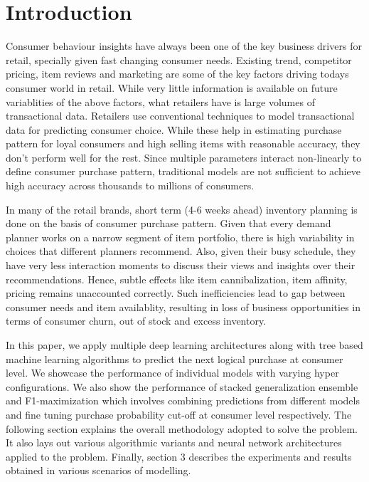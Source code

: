 \section{Introduction}
Consumer behaviour insights have always been one of the key business drivers for retail, specially given
fast changing consumer needs. Existing trend, competitor pricing, item reviews and marketing are some of the 
key factors driving todays consumer world in retail. While very little information is available
on future variablities of the above factors, what retailers have is large volumes of transactional data.
Retailers use conventional techniques to model transactional data for predicting consumer choice. 
While these help in estimating purchase pattern for loyal consumers and high selling items with reasonable accuracy, they 
don't perform well for the rest. Since multiple parameters interact non-linearly to define consumer purchase pattern,
traditional models are not sufficient to achieve high accuracy across thousands to millions of consumers.

In many of the retail brands, short term (4-6 weeks ahead) inventory planning is done on the basis of consumer 
purchase pattern. Given that every demand planner works on a narrow segment of item portfolio, there is high 
variability in choices that different planners recommend. Also, given their busy schedule, they have very less interaction
moments to discuss their views and insights over their recommendations. Hence, subtle effects like item cannibalization,
item affinity, pricing remains unaccounted correctly. Such inefficiencies lead to gap between consumer needs 
and item availablity, resulting in loss of business opportunities in terms of consumer churn, out of stock 
and excess inventory.

In this paper, we apply multiple deep learning architectures along with tree based machine learning algorithms
to predict the next logical purchase at consumer level. We showcase the performance of individual models with 
varying hyper configurations. We also show the performance of stacked generalization ensemble and F1-maximization 
which involves combining predictions from different models and fine tuning purchase probability cut-off at
consumer level respectively. The following section explains the overall methodology adopted to solve the problem.
It also lays out various algorithmic variants and neural network architectures applied to the problem.
Finally, section 3 describes the experiments and results obtained in various scenarios of modelling.
